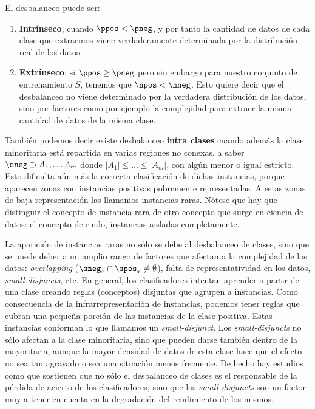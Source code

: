 El desbalanceo puede ser:

\begin{enumerate}[i]
  \item \textbf{Intrínseco}, cuando $\ppos < \pneg$, y por tanto la cantidad de datos de cada clase que extraemos viene 
  verdaderamente determinada por la distribución real de los datos.

  \item \textbf{Extrínseco}, si $\ppos \ge \pneg$ pero sin embargo para nuestro conjunto de entrenamiento $S$, 
  tenemos que $\npos < \nneg$. Esto quiere decir que el desbalanceo no viene determinado por la verdadera distribución de
  los datos, sino por factores como por ejemplo la complejidad para extraer la misma cantidad de datos de la misma clase.
\end{enumerate}

También podemos decir existe desbalanceo \textbf{intra clases} cuando además la clase minoritaria está repartida en varias 
regiones no conexas, a saber $\sneg \supset A_1, \ldots A_m$ donde $|A_1| \le \ldots \le |A_m|$, con algún menor o igual estricto.
Esto dificulta aún más la correcta clasificación de dichas instancias, porque aparecen zonas con instancias positivas 
pobremente representadas. A estas zonas de baja representación las llamamos instancias raras. Nótese que hay que distinguir
el concepto de instancia rara de otro concepto que surge en ciencia de datos: el concepto de ruido, instancias aisladas completamente.
   
La aparición de instancias raras no sólo se debe al desbalanceo de clases, sino que se puede deber a un amplio rango de factores 
que afectan a la complejidad de los datos: \textit{overlapping} ($\sneg_x \cap \spos_x \neq \emptyset$), falta de 
representatividad en los datos, \textit{small disjuncts}, etc. En general, los clasificadores intentan aprender a partir de una clase 
creando reglas (conceptos) disjuntas que agrupen a instancias. Como consecuencia de la infrarrepresentación de instancias, podemos 
tener reglas que cubran una pequeña porción de las instancias de la clase positiva. Estas instancias conforman lo que llamamos 
un \textit{small-disjunct}. Los \textit{small-disjuncts} no sólo afectan a la clase minoritaria, sino que pueden darse también 
dentro de la mayoritaria, aunque la mayor densidad de datos de esta clase hace que el efecto no sea tan agravado o 
sea una situación menos frecuente. De hecho hay estudios como \cite{jo2004} que sostienen que no sólo el desbalanceo de clases
es el responsable de la pérdida de acierto de los clasificadores, sino que los \textit{small disjuncts} son un factor muy a tener en
cuenta en la degradación del rendimiento de los mismos.


